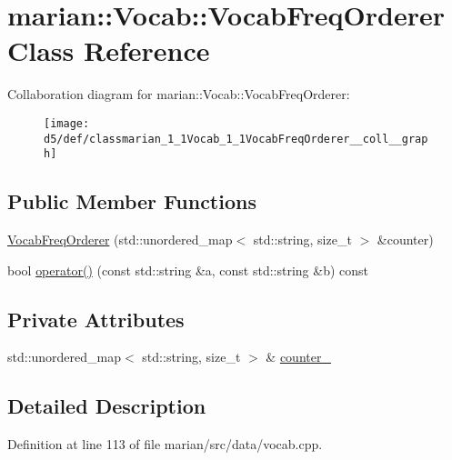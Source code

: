 \hypertarget{classmarian_1_1Vocab_1_1VocabFreqOrderer}{}\section{marian\+:\+:Vocab\+:\+:Vocab\+Freq\+Orderer Class Reference}
\label{classmarian_1_1Vocab_1_1VocabFreqOrderer}


Collaboration diagram for marian\+:\+:Vocab\+:\+:Vocab\+Freq\+Orderer\+:
\nopagebreak
\begin{figure}[H]
\begin{center}
\leavevmode
\texttt{[image: d5/def/classmarian\_1\_1Vocab\_1\_1VocabFreqOrderer\_\_coll\_\_graph]}
\end{center}
\end{figure}
\subsection*{Public Member Functions}
\begin{DoxyCompactItemize}
\item 
\hyperlink{classmarian_1_1Vocab_1_1VocabFreqOrderer_abeb53dd639a6f40bb0d7c134a6b844e2}{Vocab\+Freq\+Orderer} (std\+::unordered\+\_\+map$<$ std\+::string, size\+\_\+t $>$ \&counter)
\item 
bool \hyperlink{classmarian_1_1Vocab_1_1VocabFreqOrderer_ab3ff15db1382decb622fd23d442aa18c}{operator()} (const std\+::string \&a, const std\+::string \&b) const 
\end{DoxyCompactItemize}
\subsection*{Private Attributes}
\begin{DoxyCompactItemize}
\item 
std\+::unordered\+\_\+map$<$ std\+::string, size\+\_\+t $>$ \& \hyperlink{classmarian_1_1Vocab_1_1VocabFreqOrderer_a1da97bc718acb34e0fe6e5c40a93291a}{counter\+\_\+}
\end{DoxyCompactItemize}


\subsection{Detailed Description}


Definition at line 113 of file marian/src/data/vocab.\+cpp.



